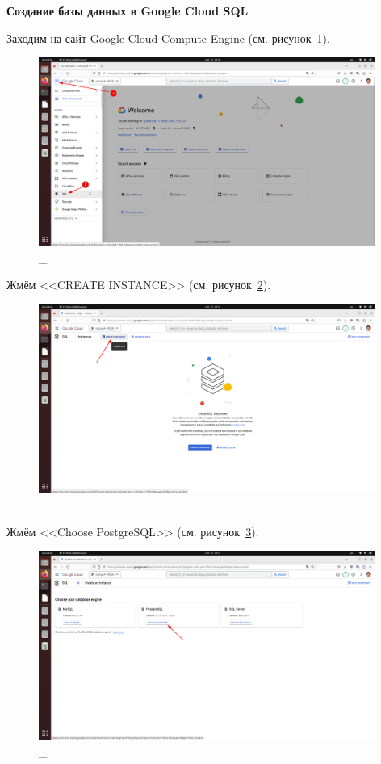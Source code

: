 \documentclass[12pt, a4paper, simple]{eskdtext}
\begin{document}
  \newpage
  
  \textbf{Создание базы данных в Google Cloud SQL}

  Заходим на сайт Google Cloud Compute Engine \cite{GoogleCloudComputeEngine} (см. рисунок~\ref{fig:19}).

  \begin{figure}[!h]
    \centering
    \includegraphics[width=11cm]
    {images/2023-02-25_23-57-13.png}
    \caption{\_}
    \label{fig:19}
  \end{figure}

  Жмём <<CREATE INSTANCE>> (см. рисунок~\ref{fig:20}).

  \begin{figure}[!h]
    \centering
    \includegraphics[width=11cm]
    {images/2023-02-25_23-57-47.png}
    \caption{\_}
    \label{fig:20}
  \end{figure}

  Жмём <<Choose PostgreSQL>> (см. рисунок~\ref{fig:21}).

  \begin{figure}[!h]
    \centering
    \includegraphics[width=11cm]
    {images/2023-02-25_23-58-04.png}
    \caption{\_}
    \label{fig:21}
  \end{figure}
\end{document}
